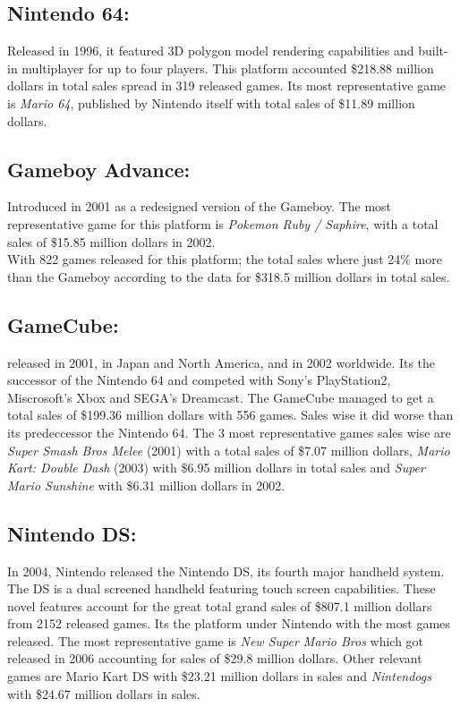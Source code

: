 \subsection{Nintendo 64:} Released in 1996, it featured 3D polygon model
rendering capabilities and built-in multiplayer for up to four
players\cite{Nintendo}. This platform accounted \$218.88 million dollars in
total sales spread in 319 released games. Its most representative game is
\textit{Mario 64}, published by Nintendo itself with total sales of \$11.89 million
dollars.\\
\subsection{Gameboy Advance:} Introduced in 2001 as a redesigned version of
the Gameboy\cite{Nintendo}. The most representative game for this platform is
\textit{Pokemon Ruby / Saphire}, with a total sales of \$15.85 million dollars
in 2002.\\
With 822 games released for this platform; the total sales where just 24\%
more than the Gameboy according to the data for \$318.5 million dollars in
total sales.\\
\subsection{GameCube:} released in 2001, in Japan and North America, and in
2002 worldwide. Its the successor of the Nintendo 64 and competed with Sony's
PlayStation2, Miscrosoft's Xbox and SEGA's Dreamcast\cite{Nintendo}. The
GameCube managed to get a total sales of \$199.36 million dollars with 556
games. Sales wise it did worse than its predeccessor the Nintendo 64. The 3
most representative games sales wise are \textit{Super Smash Bros Melee} (2001) with a
total sales of \$7.07 million dollars, \textit{Mario Kart: Double Dash} (2003) with \$6.95
million dollars in total sales and \textit{Super Mario Sunshine} with \$6.31 million
dollars in 2002.\\
\subsection{Nintendo DS:} In 2004, Nintendo released the Nintendo DS, its
fourth major handheld system. The DS is a dual screened handheld featuring
touch screen capabilities\cite{Nintendo}. These novel features account for
the great total grand sales of \$807.1 million dollars from 2152 released
games. Its the platform under Nintendo with the most games released. The most
representative game is \textit{New Super Mario Bros} which got released in 2006
accounting for sales of \$29.8 million dollars. Other relevant games are
Mario Kart DS with \$23.21 million dollars in sales and \textit{Nintendogs} with \$24.67
million dollars in sales.\\
